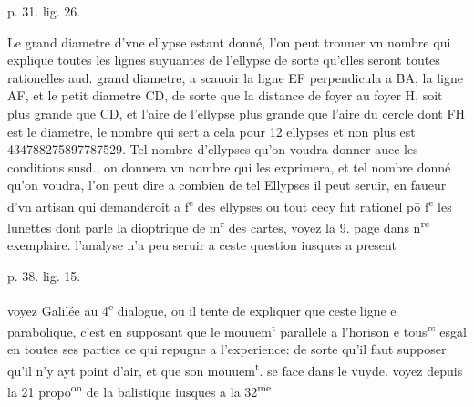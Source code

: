 \documentclass[11pt,a4paper]{article}
\begin{document}

p. 31. lig. 26.

Le grand diametre d'vne ellypse estant donné, l'on peut trouuer vn nombre qui explique toutes les lignes suyuantes de l'ellypse de sorte qu'elles seront toutes rationelles aud. grand diametre, a scauoir la ligne EF perpendicula a BA, la ligne AF, et le petit diametre CD, de sorte que la distance de \ill{} foyer au foyer H, soit plus grande que CD, et l'aire de l'ellypse plus grande que l'aire du cercle dont FH est le diametre, le nombre qui sert a cela pour 12 ellypses et non plus est 434788275897787529. Tel nombre d'ellypses qu'on voudra donner auec les conditions susd., on donnera vn nombre qui les exprimera, et tel nombre donné qu'on voudra, l'on peut dire a combien de tel Ellypses il peut seruir, en faueur d'vn artisan qui demanderoit a f\textsuperscript{e} des ellypses ou tout cecy fut rationel pō f\textsuperscript{e} les lunettes dont parle la dioptrique de m\textsuperscript{r} des cartes, voyez la 9. page dans n\textsuperscript{re} exemplaire. l'analyse n'a peu seruir a ceste question iusques a present

p. 38. lig. 15.

voyez Galilée au 4\textsuperscript{e} dialogue, ou il tente de expliquer que ceste ligne ē parabolique, c'est en supposant que le mouuem\textsuperscript{t} parallele a l'horison ē tous\textsuperscript{rs} esgal en toutes ses parties ce qui repugne a l'experience: de sorte qu'il faut supposer qu'il n'y ayt point d'air, et que son mouuem\textsuperscript{t}. se face dans le vuyde. voyez depuis la 21 propo\textsuperscript{on} de la balistique iusques a la 32\textsuperscript{me}
\end{document}
